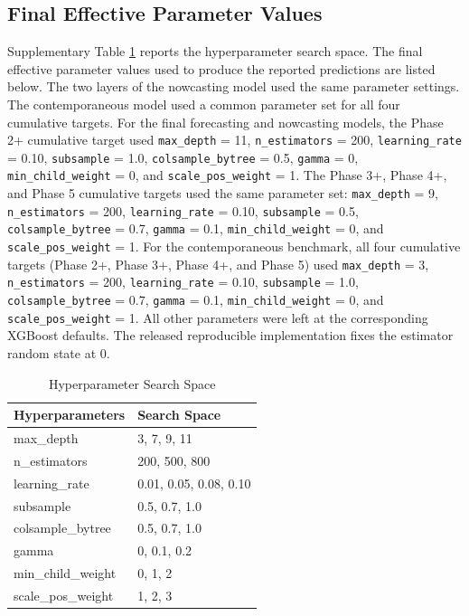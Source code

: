 \documentclass[pdflatex,sn-mathphys-num]{sn-jnl}%
\theoremstyle{thmstyleone}%
\theoremstyle{thmstyletwo}%
\theoremstyle{thmstylethree}%
\begin{document}
\subsection*{Final Effective Parameter Values}
Supplementary Table \ref{hyperparameter} reports the hyperparameter search space. The final effective parameter values used to produce the reported predictions are listed below. The two layers of the nowcasting model used the same parameter settings. The contemporaneous model used a common parameter set for all four cumulative targets. For the final forecasting and nowcasting models, the Phase 2+ cumulative target used \texttt{max\_depth} = 11, \texttt{n\_estimators} = 200, \texttt{learning\_rate} = 0.10, \texttt{subsample} = 1.0, \texttt{colsample\_bytree} = 0.5, \texttt{gamma} = 0, \texttt{min\_child\_weight} = 0, and \texttt{scale\_pos\_weight} = 1. The Phase 3+, Phase 4+, and Phase 5 cumulative targets used the same parameter set: \texttt{max\_depth} = 9, \texttt{n\_estimators} = 200, \texttt{learning\_rate} = 0.10, \texttt{subsample} = 0.5, \texttt{colsample\_bytree} = 0.7, \texttt{gamma} = 0.1, \texttt{min\_child\_weight} = 0, and \texttt{scale\_pos\_weight} = 1. For the contemporaneous benchmark, all four cumulative targets (Phase 2+, Phase 3+, Phase 4+, and Phase 5) used \texttt{max\_depth} = 3, \texttt{n\_estimators} = 200, \texttt{learning\_rate} = 0.10, \texttt{subsample} = 1.0, \texttt{colsample\_bytree} = 0.7, \texttt{gamma} = 0.1, \texttt{min\_child\_weight} = 0, and \texttt{scale\_pos\_weight} = 1.
All other parameters were left at the corresponding XGBoost defaults. 
The released reproducible implementation fixes the estimator random state at 0. 

\newpage
\clearpage
\begin{table}[htbp]
\centering
\caption{Hyperparameter Search Space} \label{hyperparameter}
\begin{tabular}{l l}
\hline
Hyperparameters & Search Space \\
\hline
max\_depth & 3, 7, 9, 11 \\
n\_estimators & 200, 500, 800 \\
learning\_rate & 0.01, 0.05, 0.08, 0.10 \\
subsample & 0.5, 0.7, 1.0 \\
colsample\_bytree & 0.5, 0.7, 1.0 \\
gamma & 0, 0.1, 0.2 \\
min\_child\_weight & 0, 1, 2 \\
scale\_pos\_weight & 1, 2, 3 \\
\hline
\end{tabular}
\end{table}
\end{document}
